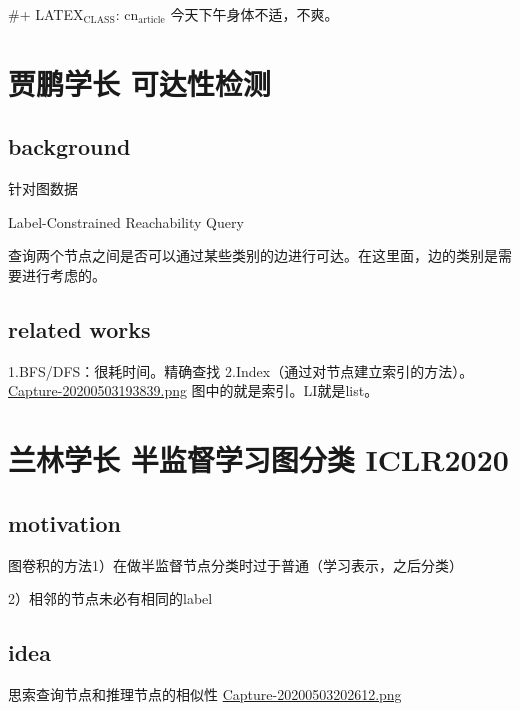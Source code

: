 \documentclass[11pt]{article}
\date{\today}
\title{}
\begin{document}
\tableofcontents

\#+ LATEX\(_{\text{CLASS}}\): cn\(_{\text{article}}\)
今天下午身体不适，不爽。

\section{贾鹏学长  可达性检测}
\label{sec:org440e926}
\subsection{background}
\label{sec:orgcd5f10a}
针对图数据

Label-Constrained Reachability Query

查询两个节点之间是否可以通过某些类别的边进行可达。在这里面，边的类别是需要进行考虑的。

\subsection{related works}
\label{sec:orgf1b2ada}
1.BFS/DFS：很耗时间。精确查找
2.Index（通过对节点建立索引的方法）。
\href{./images/20200503193839.png}{Capture-20200503193839.png}
图中的就是索引。LI就是list。

\section{兰林学长 半监督学习图分类 ICLR2020}
\label{sec:org6080f12}
\subsection{motivation}
\label{sec:org9533076}
图卷积的方法1）在做半监督节点分类时过于普通（学习表示，之后分类）

2）相邻的节点未必有相同的label

\subsection{idea}
\label{sec:org5869e0b}
思索查询节点和推理节点的相似性
\href{./images/20200503202612.png}{Capture-20200503202612.png}
\end{document}
